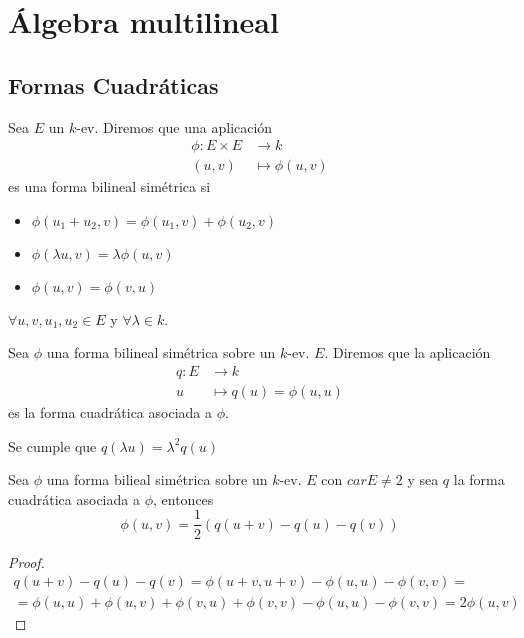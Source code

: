 \section{Álgebra multilineal}

\subsection{Formas Cuadráticas}

\begin{defi}
	Sea $E$ un $k$-ev. Diremos que una aplicación
	\[
		\begin{aligned}
			\phi \colon E \times E &\to k \\
			(u,v) &\mapsto \phi(u,v)
		\end{aligned}
	\]
	es una forma bilineal simétrica si \begin{itemize}
		\item $\phi(u_1 + u_2, v) = \phi(u_1, v) + \phi(u_2, v)$
		\item $\phi(\lambda u, v) = \lambda\phi(u,v)$
		\item $\phi(u,v) = \phi(v,u)$
	\end{itemize}
	$\forall u,v,u_1,u_2 \in E$ y $\forall \lambda \in k$.
\end{defi}
\begin{defi}
	Sea $\phi$ una forma bilineal simétrica sobre un $k$-ev. $E$.
	Diremos que la aplicación
	\[
		\begin{aligned}
			q \colon E &\to k \\
			u &\mapsto q(u) = \phi(u,u)
		\end{aligned}
	\]
	es la forma cuadrática asociada a $\phi$.
\end{defi}
\begin{obs}
	Se cumple que $q(\lambda u) = \lambda^2 q(u)$
\end{obs}
\begin{lema}
	Sea $\phi$ una forma bilieal simétrica sobre un $k$-ev. $E$ con $car E \neq 2$
	y sea $q$ la forma cuadrática asociada a $\phi$, entonces
	\[
		\phi(u,v) = \frac{1}{2} ( q(u+v) - q(u) - q(v))
	\]
\end{lema}
\begin{proof}
	\[
	\begin{split}
		q(u+v) - q(u) - q(v) = \phi(u+v,u+v) - \phi(u,u) - \phi(v,v) = \\
		=\phi(u,u) + \phi(u,v) + \phi(v,u)  + \phi(v,v) - \phi(u,u) - \phi(v,v) =
		2 \phi(u,v)
	\end{split}
	\]
\end{proof}

